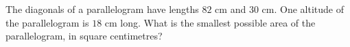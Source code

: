 The diagonals of a parallelogram have lengths $82$ cm and $30$ cm. One altitude of the parallelogram is $18$ cm long. What is the smallest possible area of the parallelogram, in square centimetres?
